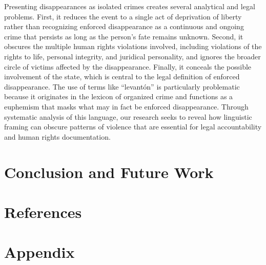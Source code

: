 \documentclass{article}
\begin{document}
Presenting disappearances as isolated crimes creates several analytical and legal problems. First, it reduces the event to a single act of deprivation of liberty rather than recognizing enforced disappearance as a continuous and ongoing crime that persists as long as the person’s fate remains unknown. Second, it obscures the multiple human rights violations involved, including violations of the rights to life, personal integrity, and juridical personality, and ignores the broader circle of victims affected by the disappearance. Finally, it conceals the possible involvement of the state, which is central to the legal definition of enforced disappearance. The use of terms like “levantón” is particularly problematic because it originates in the lexicon of organized crime and functions as a euphemism that masks what may in fact be enforced disappearance. Through systematic analysis of this language, our research seeks to reveal how linguistic framing can obscure patterns of violence that are essential for legal accountability and human rights documentation.


\section{Conclusion and Future Work}\label{conclusion-and-future-work}

\section*{References}

\appendix
\section{Appendix}\label{appendix}
\end{document}
